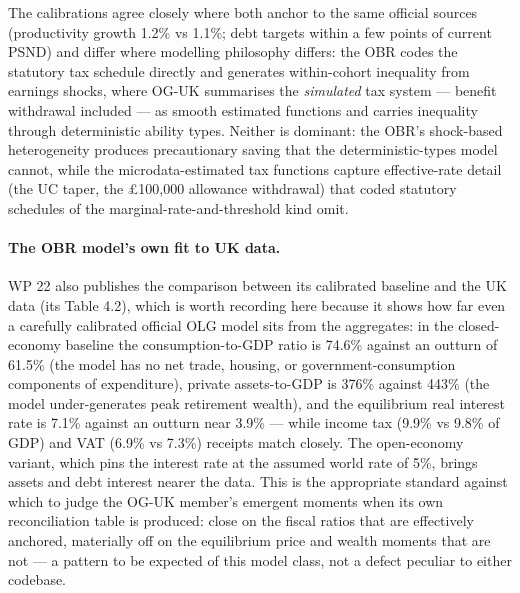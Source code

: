 The calibrations agree closely where both anchor to the same official sources (productivity growth 1.2\% vs 1.1\%; debt targets within a few points of current PSND) and differ where modelling philosophy differs: the OBR codes the statutory tax schedule directly and generates within-cohort inequality from earnings shocks, where OG-UK summarises the \emph{simulated} tax system --- benefit withdrawal included --- as smooth estimated functions and carries inequality through deterministic ability types. Neither is dominant: the OBR's shock-based heterogeneity produces precautionary saving that the deterministic-types model cannot, while the microdata-estimated tax functions capture effective-rate detail (the UC taper, the \pounds 100,000 allowance withdrawal) that coded statutory schedules of the marginal-rate-and-threshold kind omit.

\paragraph{The OBR model's own fit to UK data.} WP 22 also publishes the comparison between its calibrated baseline and the UK data (its Table 4.2), which is worth recording here because it shows how far even a carefully calibrated official OLG model sits from the aggregates: in the closed-economy baseline the consumption-to-GDP ratio is 74.6\% against an outturn of 61.5\% (the model has no net trade, housing, or government-consumption components of expenditure), private assets-to-GDP is 376\% against 443\% (the model under-generates peak retirement wealth), and the equilibrium real interest rate is 7.1\% against an outturn near 3.9\% --- while income tax (9.9\% vs 9.8\% of GDP) and VAT (6.9\% vs 7.3\%) receipts match closely. The open-economy variant, which pins the interest rate at the assumed world rate of 5\%, brings assets and debt interest nearer the data. This is the appropriate standard against which to judge the OG-UK member's emergent moments when its own reconciliation table is produced: close on the fiscal ratios that are effectively anchored, materially off on the equilibrium price and wealth moments that are not --- a pattern to be expected of this model class, not a defect peculiar to either codebase.

